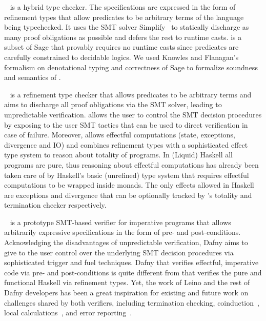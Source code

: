 ~\cite{Knowles10} is a hybrid type checker. 
The specifications are expressed in the form of refinement types 
that allow predicates to
be arbitrary terms of the language being typechecked. 
It uses the SMT solver Simplify~\cite{simplifyj} to statically discharge 
as many proof obligations as possible and defers the rest to runtime casts. 
%
\toolname is a subset of Sage that provably requires no runtime casts
since predicates are carefully constrained to decidable logics. 
%
We used Knowles and Flanagan's formalism on denotational typing 
and correctness of Sage to formalize soundness and semantics of \toolname.  
 

\mypara{\fstar}~\cite{fstar} is a refinement type checker 
that allows predicates to be arbitrary terms 
and aims to discharge all proof obligations via the SMT solver, 
leading to unpredictable verification. 
%
\fstar allows the user to control the SMT decision procedures 
by exposing to the user SMT tactics that can be used to direct
verification in case of failure. 
% 
Moreover, \fstar allows effectful computations 
(\eg state, exceptions, divergence and IO)
and combines refinement types with a sophisticated effect type system 
to reason about totality of programs. 
%
In (Liquid) Haskell all programs are pure, thus reasoning about effectful
computations has already been taken care of by Haskell's basic (\ie unrefined) 
type system that requires effectful computations to be wrapped inside monads. 
% 
The only effects allowed in Haskell are exceptions and divergence 
that can be optionally tracked by \toolname's totality and termination checker respectively. 


~\cite{dafny} is a prototype SMT-based verifier 
for imperative programs that allows arbitrarily expressive specifications 
in the form of pre- and post-conditions. 
%
Acknowledging the disadvantages of unpredictable verification, 
Dafny aims to give to the user control over the underlying SMT 
decision procedures 
via sophisticated trigger and fuel techniques. 
%
Dafny
that verifies effectful, imperative code via pre- and post-conditions
is quite different from \toolname
that verifies the pure and functional Haskell via refinement types. 
%
Yet, the work of Leino and the rest of Dafny developers 
has been a great inspiration for existing and future work 
on challenges shared by both verifiers, 
including termination checking, 
coinduction~\cite{LeinoM14}, 
local calculations~\cite{LeinoPolikarpova16}, 
and error reporting~\cite{GouesLM11}. 


